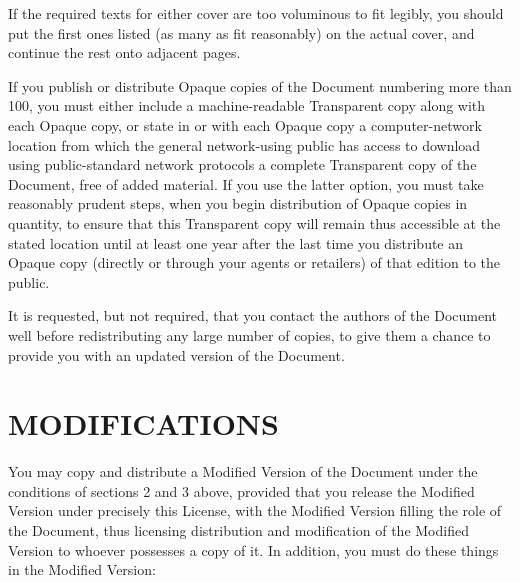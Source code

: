 \documentclass{stacks-project-book}
\theoremstyle{plain}
\theoremstyle{definition}
\theoremstyle{remark}
\numberwithin{equation}{subsection}
\begin{document}
If the required texts for either cover are too voluminous to fit
legibly, you should put the first ones listed (as many as fit
reasonably) on the actual cover, and continue the rest onto adjacent
pages.

If you publish or distribute Opaque copies of the Document numbering
more than 100, you must either include a machine-readable Transparent
copy along with each Opaque copy, or state in or with each Opaque copy
a computer-network location from which the general network-using
public has access to download using public-standard network protocols
a complete Transparent copy of the Document, free of added material.
If you use the latter option, you must take reasonably prudent steps,
when you begin distribution of Opaque copies in quantity, to ensure
that this Transparent copy will remain thus accessible at the stated
location until at least one year after the last time you distribute an
Opaque copy (directly or through your agents or retailers) of that
edition to the public.

It is requested, but not required, that you contact the authors of the
Document well before redistributing any large number of copies, to give
them a chance to provide you with an updated version of the Document.


\section{MODIFICATIONS}
\label{fdl-section-modifications}

You may copy and distribute a Modified Version of the Document under
the conditions of sections 2 and 3 above, provided that you release
the Modified Version under precisely this License, with the Modified
Version filling the role of the Document, thus licensing distribution
and modification of the Modified Version to whoever possesses a copy
of it.  In addition, you must do these things in the Modified Version:
\end{document}
